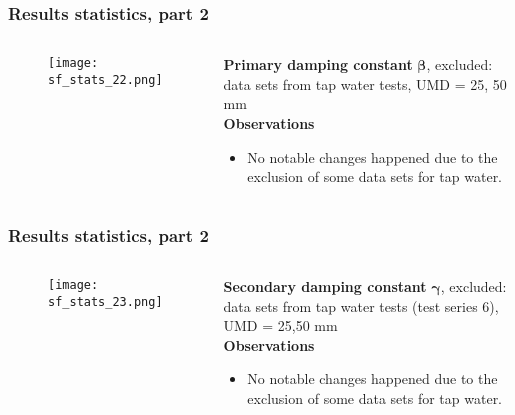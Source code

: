 	\begin{frame}
		\frametitle{Results \textendash{} statistics, part 2}
		\begin{columns}[t]
			\begin{RIPcolleft}
				\begin{figure}
					\texttt{[image: sf\_stats\_22.png]}
				\end{figure}
			\end{RIPcolleft}
			\begin{RIPcolright}
				\textbf{Primary damping constant }$\mathbf{\beta}$, excluded: data sets from tap water tests, UMD = 25, 50 mm\\
				\vspace*{.5em}
				\textbf{Observations}\\
				\begin{itemize}
					\item No notable changes happened due to the exclusion of some data sets for tap water.
				\end{itemize}
			\end{RIPcolright}
		\end{columns}
	\end{frame}

	\begin{frame}
		\frametitle{Results \textendash{} statistics, part 2}
		\begin{columns}[t]
			\begin{RIPcolleft}
				\begin{figure}
					\texttt{[image: sf\_stats\_23.png]}
				\end{figure}
			\end{RIPcolleft}
			\begin{RIPcolright}
				\textbf{Secondary damping constant }$\mathbf{\gamma}$, excluded: data sets from tap water tests (test series 6), UMD = 25,50 mm\\
				\vspace*{.5em}
				\textbf{Observations}\\
				\begin{itemize}
					\item No notable changes happened due to the exclusion of some data sets for tap water.
				\end{itemize}
			\end{RIPcolright}
		\end{columns}
	\end{frame}


